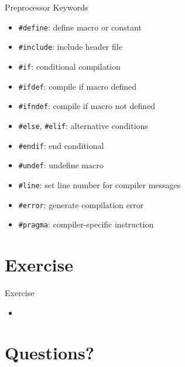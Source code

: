 \documentclass[12pt, aspectratio=169]{beamer}
\begin{document}
    \begin{frame}{Preprocessor Keywords}
        \begin{itemize}
            \item \texttt{\#define}: define macro or constant
            \item \texttt{\#include}: include header file
            \item \texttt{\#if}: conditional compilation
            \item \texttt{\#ifdef}: compile if macro defined
            \item \texttt{\#ifndef}: compile if macro not defined
            \item \texttt{\#else}, \texttt{\#elif}: alternative conditions
            \item \texttt{\#endif}: end conditional
            \item \texttt{\#undef}: undefine macro
            \item \texttt{\#line}: set line number for compiler messages
            \item \texttt{\#error}: generate compilation error
            \item \texttt{\#pragma}: compiler-specific instruction
        \end{itemize}
    \end{frame}


    \section{Exercise}

    \begin{frame}{Exercise}
        \begin{itemize}
            \item 
        \end{itemize}
    \end{frame}

    \section*{Questions?}
\end{document}
